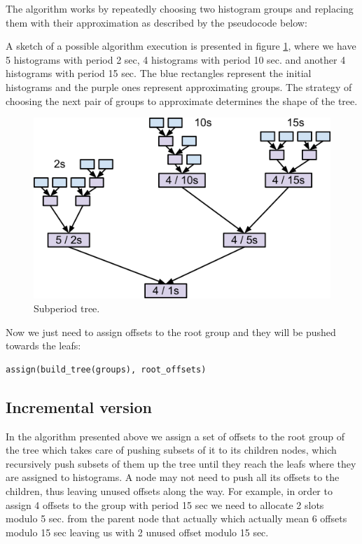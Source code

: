 The algorithm works by repeatedly choosing two histogram groups and replacing them with their approximation as described by the pseudocode below:

A sketch of a possible algorithm execution is presented in figure \ref{fig:subperiod_tree}, where we have 5 histograms with period 2 sec, 4 histograms with period 10 sec. and another 4 histograms with period 15 sec. The blue rectangles represent the initial histograms and the purple ones represent approximating groups. The strategy of choosing the next pair of groups to approximate determines the shape of the tree.
\begin{figure}[ht!]
\centering
\includegraphics[scale=0.7]{Images/subperiod_tree.png}
\caption{Subperiod tree.}
\label{fig:subperiod_tree}
\end{figure}

Now we just need to assign offsets to the root group and they will be pushed towards the leafs:
\begin{verbatim}
assign(build_tree(groups), root_offsets)
\end{verbatim}

\subsection{Incremental version}

In the algorithm presented above we assign a set of offsets to the root group of the tree which takes care of pushing subsets of it to its children nodes, which recursively push subsets of them up the tree until they reach the leafs where they are assigned to histograms. A node may not need to push all its offsets to the children, thus leaving unused offsets along the way. For example, in order to assign 4 offsets to the group with period 15 sec we need to allocate 2 slots modulo 5 sec. from the parent node that actually which actually mean 6 offsets modulo 15 sec leaving us with 2 unused offset modulo 15 sec.

